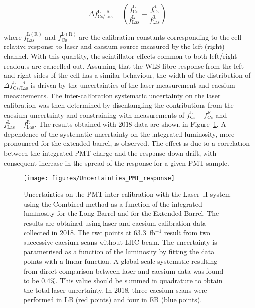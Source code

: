\begin{equation}
\Delta f^{\mathrm{L-R}}_{\mathrm{Cs/Las}}=\left( \frac{f^{\mathrm{L}}_{\mathrm{Cs}}}{f^{\mathrm{L}}_{\mathrm{Las}}}- 
\frac{f^{\mathrm{R}}_{\mathrm{Cs}}}{f^{\mathrm{R}}_{\mathrm{Las}}} \right)
\label{eq:sys_Cs-Laser}
\end{equation}

where $f^{\mathrm{L(R)}}_{\mathrm{Las}}$ and $f^{\mathrm{L(R)}}_{\mathrm{Cs}}$ are the calibration constants corresponding to the cell relative response to laser and caesium source measured by the left (right) channel. With this quantity, the scintillator effects common to both left/right readouts are cancelled out. Assuming that the WLS fibre response from the left and right sides of the cell has a similar behaviour, the width of the distribution of $\Delta f^{\mathrm{L-R}}_{\mathrm{Cs/Las}}$ is driven by the uncertainties of the laser measurement and caesium measurements. The inter-calibration systematic uncertainty on the laser calibration was then determined by disentangling the contributions from the caesium uncertainty and constraining with measurements of $f^{\mathrm{L}}_{\mathrm{Cs}}-f^{\mathrm{R}}_{\mathrm{Cs}}$ and $f^{\mathrm{L}}_{\mathrm{Las}}-f^{\mathrm{R}}_{\mathrm{Las}}$. The results obtained with 2018 data are shown in Figure~\ref{fig:sigma_Las}. A dependence of the systematic uncertainty on the integrated luminosity, more pronounced for the extended barrel, is observed. The effect is due to a correlation between the integrated PMT charge and the response down-drift, with consequent increase in the spread of the response for a given PMT sample.

\begin{figure}[htbp]
\centering
\texttt{[image: figures/Uncertainties\_PMT\_response]}
\caption{Uncertainties on the PMT inter-calibration with the Laser~II system using the Combined method as a function of the integrated luminosity for the Long Barrel and for the Extended Barrel. The results are obtained using laser and caesium calibration data collected in 2018. The two points at 63.3~fb$^{-1}$ result from two successive caesium scans without LHC beam. The uncertainty is parametrised as a function of the luminosity by fitting the data points with a linear function. A global scale systematic resulting from direct comparison between laser and caesium data was found to be 0.4\%. This value should be summed in quadrature to obtain the total laser uncertainty. In 2018, three caesium scans were performed in LB (red points) and four in EB (blue points).}
\label{fig:sigma_Las}
\end{figure}

